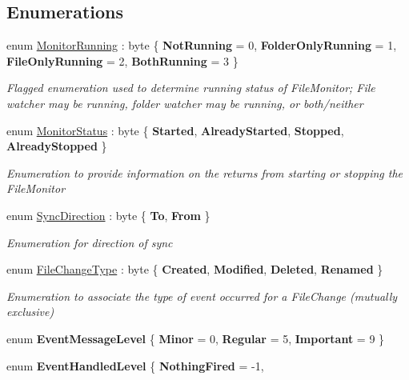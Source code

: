 \subsection*{Enumerations}
\begin{DoxyCompactItemize}
\item 
enum \hyperlink{namespace_cloud_api_public_1_1_static_a502726756c6bc84b5c9bcaf23c3a8d28}{Monitor\-Running} \-: byte \{ {\bfseries Not\-Running} = 0, 
{\bfseries Folder\-Only\-Running} = 1, 
{\bfseries File\-Only\-Running} = 2, 
{\bfseries Both\-Running} = 3
 \}
\begin{DoxyCompactList}\small\item\em Flagged enumeration used to determine running status of File\-Monitor; File watcher may be running, folder watcher may be running, or both/neither \end{DoxyCompactList}\item 
enum \hyperlink{namespace_cloud_api_public_1_1_static_a31db95951688473984962a22ad05a45f}{Monitor\-Status} \-: byte \{ {\bfseries Started}, 
{\bfseries Already\-Started}, 
{\bfseries Stopped}, 
{\bfseries Already\-Stopped}
 \}
\begin{DoxyCompactList}\small\item\em Enumeration to provide information on the returns from starting or stopping the File\-Monitor \end{DoxyCompactList}\item 
enum \hyperlink{namespace_cloud_api_public_1_1_static_a8ba5d1f6d06fa058730616f021c8974f}{Sync\-Direction} \-: byte \{ {\bfseries To}, 
{\bfseries From}
 \}
\begin{DoxyCompactList}\small\item\em Enumeration for direction of sync \end{DoxyCompactList}\item 
enum \hyperlink{namespace_cloud_api_public_1_1_static_a08ff1fddb1dc38f7b861b0fd106834be}{File\-Change\-Type} \-: byte \{ {\bfseries Created}, 
{\bfseries Modified}, 
{\bfseries Deleted}, 
{\bfseries Renamed}
 \}
\begin{DoxyCompactList}\small\item\em Enumeration to associate the type of event occurred for a File\-Change (mutually exclusive) \end{DoxyCompactList}\item 
enum {\bfseries Event\-Message\-Level} \{ {\bfseries Minor} = 0, 
{\bfseries Regular} = 5, 
{\bfseries Important} = 9
 \}
\item 
enum {\bfseries Event\-Handled\-Level} \{ {\bfseries Nothing\-Fired} = -\/1, 

\end{DoxyCompactItemize}
